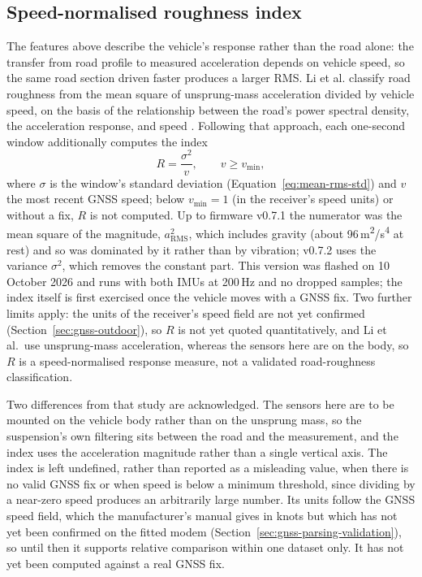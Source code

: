 \subsection{Speed-normalised roughness index}
\label{sec:speed-norm}

The features above describe the vehicle's response rather than the road alone: the transfer from road profile to measured acceleration depends on vehicle speed, so the same road section driven faster produces a larger RMS. Li et al. classify road roughness from the mean square of unsprung-mass acceleration divided by vehicle speed, on the basis of the relationship between the road's power spectral density, the acceleration response, and speed \cite{li2018}. Following that approach, each one-second window additionally computes the index
\begin{equation}
R = \frac{\sigma^2}{v}, \qquad v \ge v_{\min},
\label{eq:speed-index}
\end{equation}
where $\sigma$ is the window's standard deviation (Equation~\eqref{eq:mean-rms-std}) and $v$ the most recent GNSS speed; below $v_{\min} = 1$ (in the receiver's speed units) or without a fix, $R$ is not computed. Up to firmware v0.7.1 the numerator was the mean square of the magnitude, $a_{\mathrm{RMS}}^2$, which includes gravity (about 96\,m\textsuperscript{2}/s\textsuperscript{4} at rest) and so was dominated by it rather than by vibration; v0.7.2 uses the variance $\sigma^2$, which removes the constant part. This version was flashed on 10 October 2026 and runs with both IMUs at 200\,Hz and no dropped samples; the index itself is first exercised once the vehicle moves with a GNSS fix. Two further limits apply: the units of the receiver's speed field are not yet confirmed (Section~\ref{sec:gnss-outdoor}), so $R$ is not yet quoted quantitatively, and Li et al.\ use unsprung-mass acceleration, whereas the sensors here are on the body, so $R$ is a speed-normalised response measure, not a validated road-roughness classification.

Two differences from that study are acknowledged. The sensors here are to be mounted on the vehicle body rather than on the unsprung mass, so the suspension's own filtering sits between the road and the measurement, and the index uses the acceleration magnitude rather than a single vertical axis. The index is left undefined, rather than reported as a misleading value, when there is no valid GNSS fix or when speed is below a minimum threshold, since dividing by a near-zero speed produces an arbitrarily large number. Its units follow the GNSS speed field, which the manufacturer's manual gives in knots but which has not yet been confirmed on the fitted modem (Section~\ref{sec:gnss-parsing-validation}), so until then it supports relative comparison within one dataset only. It has not yet been computed against a real GNSS fix.

